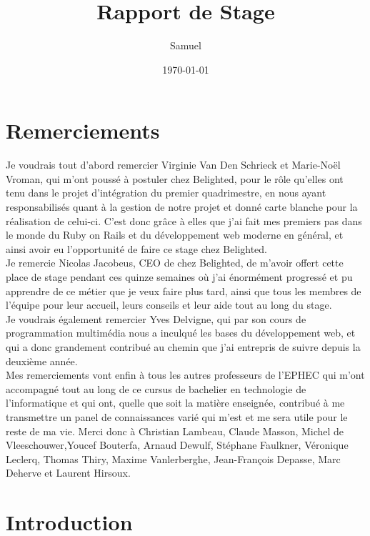 \documentclass{report}
\title{Rapport de Stage}
\author{Samuel \bsc{Monroe}}
\date{\today}
\begin{document}
\maketitle

\newpage
\thispagestyle{empty}
\mbox{}

\tableofcontents

\chapter*{Remerciements}

  Je voudrais tout d'abord remercier Virginie Van Den Schrieck et Marie-Noël Vroman, qui m'ont poussé à postuler chez Belighted, pour
  le rôle qu'elles ont tenu dans le projet d'intégration du premier quadrimestre,
  en nous ayant responsabilisés quant à la gestion de notre projet et donné carte
  blanche pour la réalisation de celui-ci.
  C'est donc grâce à elles que j'ai fait mes premiers pas dans le monde du Ruby on Rails
  et du développement web moderne en général, et ainsi avoir eu l'opportunité de faire ce stage chez Belighted.\\

  Je remercie Nicolas Jacobeus, CEO de chez Belighted, de m'avoir offert cette place de stage pendant ces quinze
  semaines où j'ai énormément progressé et pu apprendre de ce métier que je veux faire plus tard, ainsi que tous les membres
  de l'équipe pour leur accueil, leurs conseils et leur aide tout au long du stage.\\

  Je voudrais également remercier Yves Delvigne, qui par son cours de programmation multimédia
  nous a inculqué les bases du développement web, et qui a donc grandement contribué
  au chemin que j'ai entrepris de suivre depuis la deuxième année.\\

  Mes remerciements vont enfin à tous les autres professeurs de l'EPHEC qui m'ont accompagné tout au long
  de ce cursus de bachelier en technologie de l'informatique et qui ont, quelle que soit la matière
  enseignée, contribué à me transmettre un panel de connaissances varié qui m'est et me sera utile pour
  le reste de ma vie. Merci donc à Christian Lambeau, Claude Masson, Michel de Vleeschouwer,Youcef Bouterfa, Arnaud Dewulf,
  Stéphane Faulkner, Véronique Leclerq, Thomas Thiry, Maxime Vanlerberghe, Jean-François Depasse, Marc Deherve et Laurent Hirsoux.\\

\chapter{Introduction}
\end{document}
